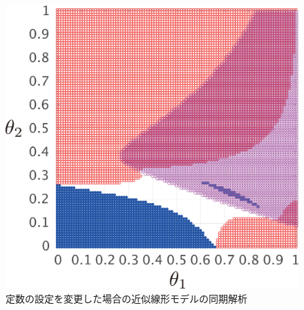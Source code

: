 \documentclass[tombow,dvipdfmx]{corona-a5}
\begin{document}
\begin{figure}[t]
{\begin{minipage}{0.32\linewidth}
    \centering
    \includegraphics[width = .85\linewidth]{figs/gam5ex}
  \end{minipage}
  \caption{定数の設定を変更した場合の近似線形モデルの同期解析}
  \label{fig:gamex}
  }
\end{figure}
\end{document}
